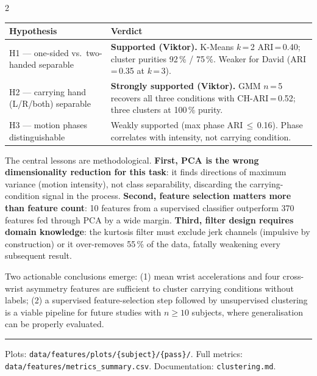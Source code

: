 \documentclass[10pt,a4paper]{article}
\begin{document}
\begin{multicols}{2}
\renewcommand{\arraystretch}{1.1}
\begin{tabularx}{\columnwidth}{@{}lX@{}}
\toprule
\textbf{Hypothesis} & \textbf{Verdict} \\
\midrule
H1 --- one-sided vs.\ two-handed separable &
  \textbf{Supported (Viktor).}
  K-Means $k$\,=\,2 ARI\,=\,0.40; cluster purities 92\,\% / 75\,\%.
  Weaker for David (ARI\,=\,0.35 at $k$\,=\,3). \\[3pt]
H2 --- carrying hand (L/R/both) separable &
  \textbf{Strongly supported (Viktor).}
  GMM $n$\,=\,5 recovers all three conditions with CH-ARI\,=\,0.52;
  three clusters at 100\,\% purity. \\[3pt]
H3 --- motion phases distinguishable &
  Weakly supported (max phase ARI\,$\leq$\,0.16).
  Phase correlates with intensity, not carrying condition. \\
\bottomrule
\end{tabularx}

\vspace{4pt}

The central lessons are methodological.
\textbf{First, PCA is the wrong dimensionality reduction for this task}: it
finds directions of maximum variance (motion intensity), not class separability,
discarding the carrying-condition signal in the process.
\textbf{Second, feature selection matters more than feature count}: 10 features
from a supervised classifier outperform 370 features fed through PCA by a wide
margin.
\textbf{Third, filter design requires domain knowledge}: the kurtosis filter must
exclude jerk channels (impulsive by construction) or it over-removes 55\,\% of
the data, fatally weakening every subsequent result.

Two actionable conclusions emerge: (1) mean wrist accelerations and four
cross-wrist asymmetry features are sufficient to cluster carrying conditions
without labels; (2) a supervised feature-selection step followed by unsupervised
clustering is a viable pipeline for future studies with $n \geq 10$ subjects,
where generalisation can be properly evaluated.

\end{multicols}

\vspace{4pt}
\hrule
\vspace{3pt}
{\footnotesize\color{darkgray}
Plots: \texttt{data/features/plots/\{subject\}/\{pass\}/}.\quad
Full metrics: \texttt{data/features/metrics\_summary.csv}.\quad
Documentation: \texttt{clustering.md}.}
\end{document}
